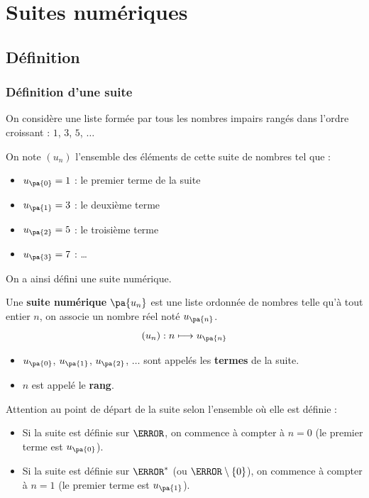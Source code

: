 \chapter{Suites numériques}

\section{Définition}

\subsection{Définition d'une suite}

\begin{ex}
	On considère une liste formée par tous les nombres impairs rangés dans l'ordre croissant : $1$, $3$, $5$, $\dots$

	On note $(u_{n})$ l'ensemble des éléments de cette suite de nombres tel que :
	\begin{itemize}
		\item $u_{\pa{0}}=1$ : le premier terme de la suite
		\item $u_{\pa{1}}=3$ : le deuxième terme
		\item $u_{\pa{2}}=5$ : le troisième terme
		\item $u_{\pa{3}}=7$ : \ldots
	\end{itemize}

	On a ainsi défini une suite numérique.
\end{ex}

\begin{definition}
	Une \textbf{suite numérique} $\pa{u_n}$ est une liste ordonnée de nombres telle qu'à tout entier $n$, on associe un nombre réel noté $u_{\pa{n}}$.
	\[
		(u_n) : n \longmapsto u_{\pa{n}}
	\]

	\begin{itemize}
		\item $u_{\pa{0}}$, $u_{\pa{1}}$, $u_{\pa{2}}$, $\dots$ sont appelés les \textbf{termes} de la suite.
		\item $n$ est appelé le \textbf{rang}.
	\end{itemize}

\end{definition}

\begin{rem}
	Attention au point de départ de la suite selon l'ensemble où elle est définie :
	\begin{itemize}
		\item Si la suite est définie sur $\N$, on commence à compter à $n = 0$ (le premier terme est $u_{\pa{0}}$).
		\item Si la suite est définie sur $\N^*$ (ou $\N \setminus \{0\}$), on commence à compter à $n = 1$ (le premier terme est $u_{\pa{1}}$).
	\end{itemize}
\end{rem}

